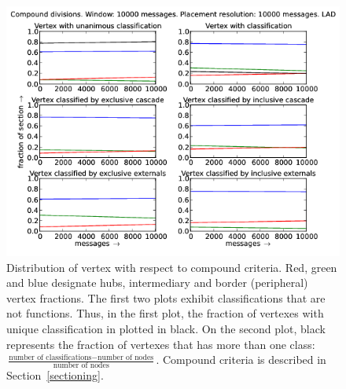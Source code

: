 \documentclass[%
 aip,
 jmp,%
 amsmath,amssymb,
 reprint,%
]{revtex4-1}
\begin{document}
\begin{figure}[hbtp] 
   \centering
        \includegraphics[width=\textwidth]{figs/LAD/10000_2}
    \caption{Distribution of vertex with respect to compound criteria. Red, green and blue designate hubs, intermediary and border (peripheral) vertex fractions. The first two plots exhibit classifications that are not functions. Thus, in the first plot, the fraction of vertexes with unique classification in plotted in black. On the second plot, black represents the fraction of vertexes that has more than one class: $\frac{\text{number of classifications} - \text{number of nodes}}{\text{number of nodes}}$. Compound criteria is described in Section~\ref{sectioning}.}
    \label{fig:lad10000_}
\end{figure}
\end{document}
